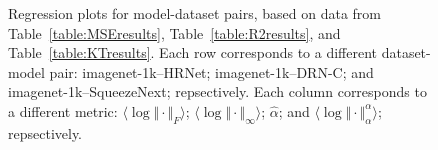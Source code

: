 \begin{figure}[t]
{        \label{fig:summary_regressions_C_10}
    }
    \caption{Regression plots for model-dataset pairs, based on data from Table~\ref{table:MSEresults}, Table~\ref{table:R2results}, and Table~\ref{table:KTresults}.
             Each row corresponds to a different dataset-model pair:
             imagenet-1k--HRNet;
             imagenet-1k--DRN-C;
             and
             imagenet-1k--SqueezeNext;
             repsectively.
             Each column corresponds to a different metric:
             $\langle\log\Vert\cdot\Vert_{F}\rangle$; 
             $\langle\log\Vert\cdot\Vert_{\infty}\rangle$; 
             $\hat{\alpha}$; 
             and
             $\langle\log\Vert\cdot\Vert^{\alpha}_{\alpha}\rangle$;
             repsectively.
            }
    \label{fig:summary_regressions_C}
\end{figure}

